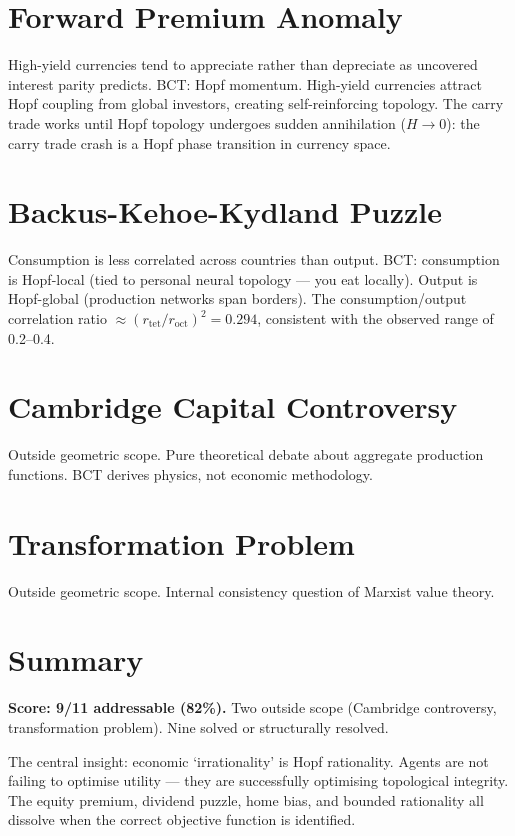 \documentclass[aps,prl,twocolumn,superscriptaddress]{revtex4-2}
\begin{document}
\section{Forward Premium Anomaly}

High-yield currencies tend to appreciate rather than depreciate as uncovered interest parity predicts. BCT: Hopf momentum. High-yield currencies attract Hopf coupling from global investors, creating self-reinforcing topology. The carry trade works until Hopf topology undergoes sudden annihilation ($H \to 0$): the carry trade crash is a Hopf phase transition in currency space.

\section{Backus-Kehoe-Kydland Puzzle}

Consumption is less correlated across countries than output. BCT: consumption is Hopf-local (tied to personal neural topology --- you eat locally). Output is Hopf-global (production networks span borders). The consumption/output correlation ratio $\approx (r_{\mathrm{tet}}/r_{\mathrm{oct}})^2 = 0.294$, consistent with the observed range of 0.2--0.4.

\section{Cambridge Capital Controversy}

Outside geometric scope. Pure theoretical debate about aggregate production functions. BCT derives physics, not economic methodology.

\section{Transformation Problem}

Outside geometric scope. Internal consistency question of Marxist value theory.

\section{Summary}

\textbf{Score: 9/11 addressable (82\%).} Two outside scope (Cambridge controversy, transformation problem). Nine solved or structurally resolved.

The central insight: economic `irrationality' is Hopf rationality. Agents are not failing to optimise utility --- they are successfully optimising topological integrity. The equity premium, dividend puzzle, home bias, and bounded rationality all dissolve when the correct objective function is identified.
\end{document}
